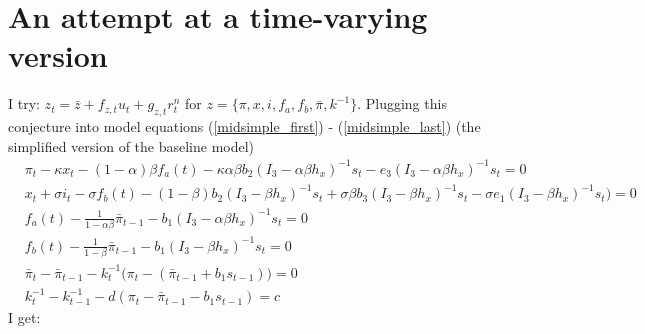 \documentclass[11pt]{article}
\renewcommand{\[}{\begin{equation}}
\renewcommand{\]}{\end{equation}}
\begin{document}
\section{An attempt at a time-varying version}
I try: $z_t = \bar{z} + f_{z,t} u_t + g_{z,t} r_t^n$ for $z = \{\pi,x,i, f_a, f_b, \bar{\pi}, k^{-1}\}$.
Plugging this conjecture into model equations (\ref{midsimple_first}) - (\ref{midsimple_last}) (the simplified version of the baseline model)
 \begin{align}
 &  \pi_t - \kappa x_t -(1-\alpha)\beta f_a(t) -\kappa\alpha\beta b_2 (I_3 - \alpha\beta h_x)^{-1}s_t - e_3(I_3 - \alpha\beta h_x)^{-1}s_t = 0 \label{midsimple_first}\\
 & x_t + \sigma i_t -\sigma f_b(t)  -  (1-\beta)b_2 (I_3 - \beta h_x)^{-1}s_t + \sigma\beta b_3 (I_3 - \beta h_x)^{-1}s_t -\sigma e_1(I_3 - \beta h_x)^{-1}s_t  \big)=0 \\
 &  f_a(t) - \frac{1}{1-\alpha\beta}\bar{\pi}_{t-1}  - b_1(I_3 - \alpha\beta h_x)^{-1}s_t  =0\\
 &  f_b(t) - \frac{1}{1-\beta}\bar{\pi}_{t-1}  - b_1(I_3 - \beta h_x)^{-1}s_t =0  \\
  &  \bar{\pi}_{t} - \bar{\pi}_{t-1} - k_t^{-1}\big(\pi_{t} -(\bar{\pi}_{t-1}+b_1 s_{t-1}) \big)  =0 \\
  &   k_t^{-1} - k_{t-1}^{-1}  - d(\pi_t - \bar{\pi}_{t-1}-b_1 s_{t-1})  = c \label{midsimple_last}
\end{align}
I get:
\end{document}
